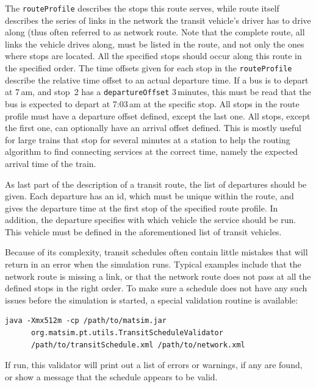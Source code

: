 The \lstinline|routeProfile| describes the stops this route serves, while route itself describes the series of links in the network the transit vehicle's driver has to drive along (thus often referred to as network route. Note that the complete route, \ie all links the vehicle drives along, must be listed in the route, and not only the ones where stops are located. All the specified stops should occur along this route in the specified order. The time offsets given for each stop in the \lstinline|routeProfile| describe the relative time offset to an actual departure time. If a bus is to depart at 7\,am, and stop~2 has a \lstinline|departureOffset| 3\,minutes, this must be read that the bus is expected to depart at 7:03\,am at the specific stop. All stops in the route profile must have a departure offset defined, except the last one. All stops, except the first one, can optionally have an arrival offset defined. This is mostly useful for large trains that stop for several minutes at a station to help the routing algorithm to find connecting services at the correct time, namely the expected arrival time of the train.

As last part of the description of a transit route, the list of departures should be given. Each departure has an id, which must be unique within the route, and gives the departure time at the first stop of the specified route profile. In addition, the departure specifies with which vehicle the service should be run. This vehicle must be defined in the aforementioned list of transit vehicles. 

Because of its complexity, transit schedules often contain little mistakes that will return in an error when the simulation runs. Typical examples include that the network route is missing a link, or that the network route does not pass at all the defined stops in the right order. To make sure a schedule does not have any such issues before the simulation is started, a special validation routine is available:

\begin{lstlisting}
java -Xmx512m -cp /path/to/matsim.jar  
      org.matsim.pt.utils.TransitScheduleValidator  
      /path/to/transitSchedule.xml /path/to/network.xml
\end{lstlisting}

If run, this validator will print out a list of errors or warnings, if any are found, or show a message that the schedule appears to be valid.

